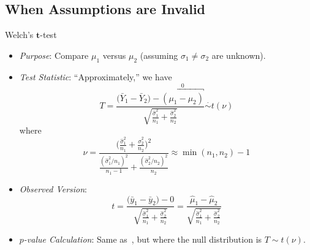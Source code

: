 \subsection{When Assumptions are Invalid}
\begin{Statistical_Test}{Welch's $ \symbf{t} $-test}{}
    \begin{itemize}
        \item \emph{Purpose}: Compare $ \mu_1 $ versus $ \mu_2 $ (assuming $ \sigma_1\ne\sigma_2 $ are unknown).
        \item \emph{Test Statistic}: ``Approximately,'' we have
              \[ T=\frac{\bigl(\bar{Y}_1-\bar{Y}_2\bigr)-\overbracket{(\mu_1-\mu_2)}^0}{\displaystyle \sqrt{\frac{\hat{\sigma}_1^2}{n_1}+\frac{\hat{\sigma}_2^2}{n_2}}}\stackrel{\cdot}{\sim} t(\nu) \]
              where
              \[ \nu=\frac{
                      \displaystyle \biggl(\frac{\hat{\sigma}_1^2}{n_1}+\frac{\hat{\sigma}_2^2}{n_2} \biggr)^{\!2}
                  }{
                      \displaystyle \frac{(\hat{\sigma}_1^2/n_1)^2}{n_1-1}+\frac{(\hat{\sigma}_2^2/n_2)^2}{n_2}
                  }\approx \min(n_1,n_2)-1  \]
        \item \emph{Observed Version}:
              \[ t=\frac{\bigl(\bar{y}_1-\bar{y}_2\bigr)-0}{\displaystyle \sqrt{\frac{\hat{\sigma}_1^2}{n_1}+\frac{\hat{\sigma}_2^2}{n_2}}}=\frac{\hat{\mu}_1-\hat{\mu}_2}{\displaystyle \sqrt{\frac{\hat{\sigma}_1^2}{n_1}+\frac{\hat{\sigma}_2^2}{n_2}}}  \]
        \item \emph{$ p $-value Calculation}: Same as~, but where
              the null distribution is $ T \sim t(\nu) $.
    \end{itemize}
\end{Statistical_Test}
